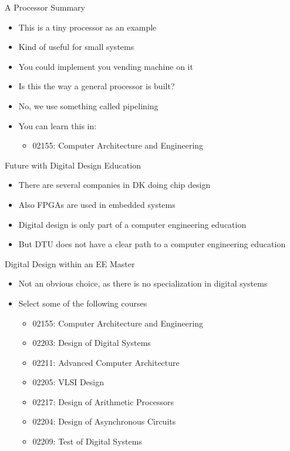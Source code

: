\begin{frame}[fragile]{A Processor Summary}
\begin{itemize}
\item This is a tiny processor as an example
\item Kind of useful for small systems
\item You could implement you vending machine on it
\item Is this the way a general processor is built?
\item No, we use something called pipelining
\item You can learn this in:
\begin{itemize}
\item 02155: Computer Architecture and Engineering
\end{itemize}
\end{itemize}
\end{frame}

\begin{frame}[fragile]{Future with Digital Design Education}
\begin{itemize}
\item There are several companies in DK doing chip design
\item Also FPGAs are used in embedded systems
\item Digital design is only part of a computer engineering education
\item But DTU does not have a clear path to a computer engineering education
\end{itemize}
\end{frame}

\begin{frame}[fragile]{Digital Design within an EE Master}
\begin{itemize}
\item Not an obvious choice, as there is no specialization in digital systems
\item Select some of the following courses
\begin{itemize}
\item 02155: Computer Architecture and Engineering
\item 02203: Design of Digital Systems
\item 02211: Advanced Computer Architecture
\item 02205: VLSI Design
\item 02217: Design of Arithmetic Processors
\item 02204: Design of Asynchronous Circuits
\item 02209: Test of Digital Systems
\end{itemize}
\end{itemize}
\end{frame}

